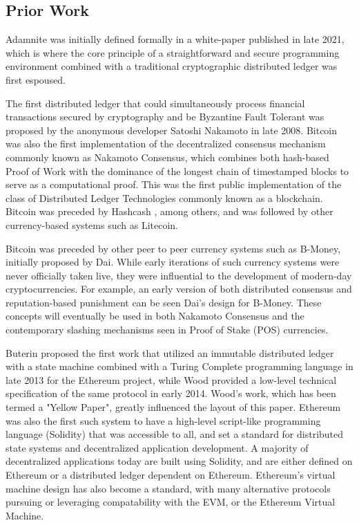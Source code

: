 \documentclass[conference]{IEEEtran}
\begin{document}
\subsection{Prior Work}
Adamnite was initially defined formally in a white-paper \cite{chaudhury2021Adamnite} published in late 2021, which is where the core principle of a straightforward and secure programming environment combined with a traditional cryptographic distributed ledger was first espoused.


The first distributed ledger that could simultaneously process financial transactions secured by cryptography and be Byzantine Fault Tolerant was proposed by the anonymous developer Satoshi Nakamoto \cite{nakamoto2008Bitcoin} in late 2008. Bitcoin was also the first implementation of the decentralized consensus mechanism commonly known as Nakamoto Consensus, which combines both hash-based Proof of Work with the dominance of the longest chain of timestamped blocks to serve as a computational proof. This was the first public implementation of the class of Distributed Ledger Technologies commonly known as a blockchain. Bitcoin was preceded by Hashcash \cite{back2002hashcash}, among others, and was followed by other currency-based systems such as Litecoin.

Bitcoin was preceded by other peer to peer currency systems such as B-Money, initially proposed by Dai. \cite{dai1998bmoney} While early iterations of such currency systems were never officially taken live, they were influential to the development of modern-day cryptocurrencies. For example, an early version of both distributed consensus and reputation-based punishment can be seen Dai's design for B-Money. These concepts will eventually be used in both Nakamoto Consensus and the contemporary slashing mechanisms seen in Proof of Stake (POS) currencies.

Buterin \cite{buterin2013Ethereum} proposed the first work that utilized an immutable distributed ledger with a state machine combined with a Turing Complete programming language in late 2013 for the Ethereum project, while Wood \cite{wood2014EthereumYellow} provided a low-level technical specification  of the same protocol in early 2014. Wood's work, which has been termed a "Yellow Paper", greatly influenced the layout of this paper. Ethereum was also the first such system to have a high-level script-like programming language (Solidity) that was accessible to all, and set a standard for distributed state systems and decentralized application development. A majority of decentralized applications today are built using Solidity, and are either defined on Ethereum or a distributed ledger dependent on Ethereum. Ethereum's virtual machine design has also become a standard, with many alternative protocols pursuing or leveraging compatability with the EVM, or the Ethereum Virtual Machine.
\end{document}
